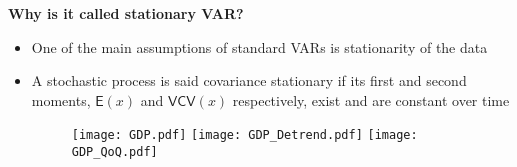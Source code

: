 \documentclass[10pt,handout]{beamer}
\begin{document}
\vspace{0.1cm}

\begin{frame}
{\textbf{Why is it called stationary VAR?}}

\begin{itemize}
\item One of the main assumptions of standard VARs is stationarity of the
data \medskip \pause

\item A stochastic process is said {{\color{red} covariance stationary}} if
its first and second moments, $\mathsf{E}\left( x\right) $ and $\mathsf{VCV}%
\left( x\right) $ respectively, exist and are constant over time\pause
\begin{figure}[tbh]
\centering\texttt{[image: GDP.pdf]} %
\texttt{[image: GDP\_Detrend.pdf]} %
\texttt{[image: GDP\_QoQ.pdf]}
\end{figure}
\end{itemize}
\end{frame}

\vspace{0.1cm}
\end{document}
